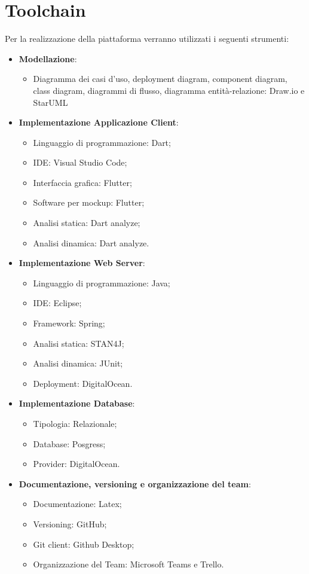 \section{Toolchain}
Per la realizzazione della piattaforma verranno utilizzati i seguenti strumenti:
\begin{itemize}
	\item \textbf{Modellazione}:
	\begin{itemize}
		\item Diagramma dei casi d'uso, deployment diagram, component diagram, class
		diagram, diagrammi di flusso, diagramma entità-relazione: Draw.io e StarUML
	\end{itemize}
	\item \textbf{Implementazione Applicazione Client}:
	\begin{itemize}
		\item Linguaggio di programmazione: Dart;
		\item IDE: Visual Studio Code;
		\item Interfaccia grafica: Flutter;
		\item Software per mockup: Flutter;
		\item Analisi statica: Dart analyze;
		\item Analisi dinamica: Dart analyze.
	\end{itemize}
	\item \textbf{Implementazione Web Server}:
	\begin{itemize}
		\item Linguaggio di programmazione: Java;
		\item IDE: Eclipse;
		\item Framework: Spring;
		\item Analisi statica: STAN4J;
		\item Analisi dinamica: JUnit;
		\item Deployment: DigitalOcean.
	\end{itemize}
	\item \textbf{Implementazione Database}:
	\begin{itemize}
		\item Tipologia: Relazionale;
		\item Database: Posgress;
		\item Provider: DigitalOcean.
	\end{itemize}
	\item \textbf{Documentazione, versioning e organizzazione del team}:
	\begin{itemize}
		\item Documentazione: Latex;
		\item Versioning: GitHub;
		\item Git client: Github Desktop;
		\item Organizzazione del Team: Microsoft Teams e Trello.
	\end{itemize}
\end{itemize}